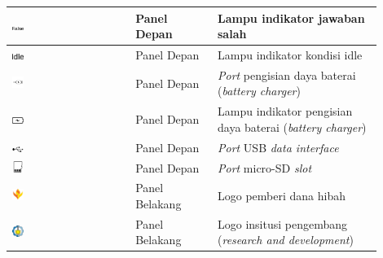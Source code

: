 \documentclass[11pt,a4paper,twoside,onecolumn]{book}
\begin{document}
\begin{longtable}{| p{0.3\linewidth} | p{0.2\linewidth}| p{0.4\linewidth}|}
				\hline
				\includegraphics[width=0.1\textwidth]{images/false} & Panel Depan & Lampu indikator jawaban salah\\
				\hline
				\includegraphics[width=0.1\textwidth]{images/idle} & Panel Depan & Lampu indikator kondisi idle\\
				\hline
				\includegraphics[width=0.1\textwidth]{images/charging-port} & Panel Depan & \emph{Port} pengisian daya baterai (\emph{battery charger})\\
				\hline
				\includegraphics[width=0.1\textwidth]{images/charging-indicator} & Panel Depan & Lampu indikator pengisian daya baterai (\emph{battery charger})\\
				\hline
				\includegraphics[width=0.1\textwidth]{images/usb-data-interface} & Panel Depan & \emph{Port} USB \emph{data interface}\\
				\hline
				\includegraphics[width=0.1\textwidth]{images/micro-SD} & Panel Depan & \emph{Port} micro-SD \emph{slot}\\
				\hline
				\includegraphics[width=0.1\textwidth]{images/lpdp} & Panel Belakang & Logo pemberi dana hibah\\
				\hline
				\includegraphics[width=0.1\textwidth]{images/its} & Panel Belakang & Logo insitusi pengembang (\emph{research and development})\\

\end{longtable}
\end{document}
